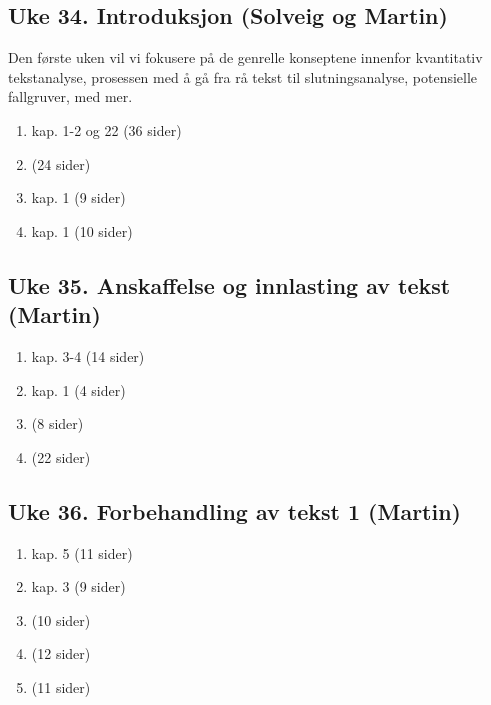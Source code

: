 \documentclass[
]{book}
\providecommand{\tightlist}{%
  \setlength{\itemsep}{0pt}\setlength{\parskip}{0pt}}
\begin{document}
\hypertarget{uke-34.-introduksjon-solveig-og-martin}{%
\subsection{Uke 34. Introduksjon (Solveig og Martin)}\label{uke-34.-introduksjon-solveig-og-martin}}

Den første uken vil vi fokusere på de genrelle konseptene innenfor kvantitativ tekstanalyse, prosessen med å gå fra rå tekst til slutningsanalyse, potensielle fallgruver, med mer.

\begin{enumerate}
\def\labelenumi{\arabic{enumi}.}
\tightlist
\item
  \citet{Grimmer2022} kap. 1-2 og 22 (36 sider)
\item
  \citet{Lucas2015} (24 sider)
\item
  \citet{Silge2017} kap. 1 (9 sider)
\item
  \citet{Pang2008} kap. 1 (10 sider)
\end{enumerate}

\hypertarget{uke-35.-anskaffelse-og-innlasting-av-tekst-martin}{%
\subsection{Uke 35. Anskaffelse og innlasting av tekst (Martin)}\label{uke-35.-anskaffelse-og-innlasting-av-tekst-martin}}

\begin{enumerate}
\def\labelenumi{\arabic{enumi}.}
\tightlist
\item
  \citet{Grimmer2022} kap. 3-4 (14 sider)
\item
  \citet{Cooksey2014} kap. 1 (4 sider)
\item
  \citet{Wickham2020} (8 sider)
\item
  \citet{Hoyland2019} (22 sider)
\end{enumerate}

\hypertarget{uke-36.-forbehandling-av-tekst-1-martin}{%
\subsection{Uke 36. Forbehandling av tekst 1 (Martin)}\label{uke-36.-forbehandling-av-tekst-1-martin}}

\begin{enumerate}
\def\labelenumi{\arabic{enumi}.}
\tightlist
\item
  \citet{Grimmer2022} kap. 5 (11 sider)
\item
  \citet{Silge2017} kap. 3 (9 sider)
\item
  \citet{Joergensen2019} (10 sider)
\item
  \citet{Barnes2019} (12 sider)
\item
  \citet{Benoit2020} (11 sider)
\end{enumerate}
\end{document}

